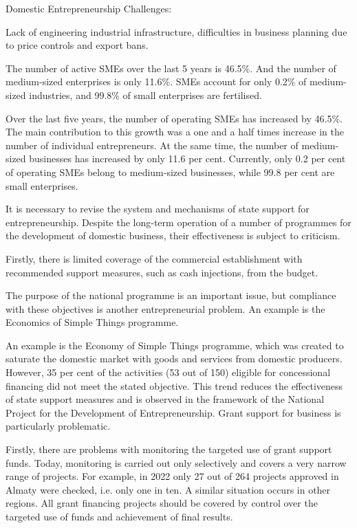 Domestic Entrepreneurship Challenges:

Lack of engineering industrial infrastructure, difficulties in business
planning due to price controls and export bans.

The number of active SMEs over the last 5 years is 46.5\%. And the
number of medium-sized enterprises is only 11.6\%. SMEs account for only
0.2\% of medium-sized industries, and 99.8\% of small enterprises are
fertilised.

Over the last five years, the number of operating SMEs has increased by
46.5\%. The main contribution to this growth was a one and a half times
increase in the number of individual entrepreneurs. At the same time,
the number of medium-sized businesses has increased by only 11.6 per
cent. Currently, only 0.2 per cent of operating SMEs belong to
medium-sized businesses, while 99.8 per cent are small enterprises.

It is necessary to revise the system and mechanisms of state support for
entrepreneurship. Despite the long-term operation of a number of
programmes for the development of domestic business, their effectiveness
is subject to criticism.

Firstly, there is limited coverage of the commercial establishment with
recommended support measures, such as cash injections, from the budget.

The purpose of the national programme is an important issue, but
compliance with these objectives is another entrepreneurial problem. An
example is the Economics of Simple Things programme.

An example is the Economy of Simple Things programme, which was created
to saturate the domestic market with goods and services from domestic
producers. However, 35 per cent of the activities (53 out of 150)
eligible for concessional financing did not meet the stated objective.
This trend reduces the effectiveness of state support measures and is
observed in the framework of the National Project for the Development of
Entrepreneurship. Grant support for business is particularly
problematic.

Firstly, there are problems with monitoring the targeted use of grant
support funds. Today, monitoring is carried out only selectively and
covers a very narrow range of projects. For example, in 2022 only 27 out
of 264 projects approved in Almaty were checked, i.e. only one in ten. A
similar situation occurs in other regions. All grant financing projects
should be covered by control over the targeted use of funds and
achievement of final results.

